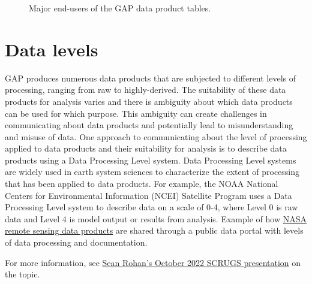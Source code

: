 \documentclass[
  letterpaper,
  oneside,
  open=any]{scrbook}
\begin{document}
\begin{figure}


\caption{\label{fig-data-used}Major end-users of the GAP data product
tables.}

\end{figure}%

\section{Data levels}\label{data-levels}

GAP produces numerous data products that are subjected to different
levels of processing, ranging from raw to highly-derived. The
suitability of these data products for analysis varies and there is
ambiguity about which data products can be used for which purpose. This
ambiguity can create challenges in communicating about data products and
potentially lead to misunderstanding and misuse of data. One approach to
communicating about the level of processing applied to data products and
their suitability for analysis is to describe data products using a Data
Processing Level system. Data Processing Level systems are widely used
in earth system sciences to characterize the extent of processing that
has been applied to data products. For example, the NOAA National
Centers for Environmental Information (NCEI) Satellite Program uses a
Data Processing Level system to describe data on a scale of 0-4, where
Level 0 is raw data and Level 4 is model output or results from
analysis. Example of how
\href{https://ladsweb.modaps.eosdis.nasa.gov/search/}{NASA remote
sensing data products} are shared through a public data portal with
levels of data processing and documentation.

For more information, see
\href{https://docs.google.com/presentation/d/1rWSZpeghWJqzWMIa5oBc4BCoy-zy1Yue86RoTw58u6M/edit?usp=sharing}{Sean
Rohan's October 2022 SCRUGS presentation} on the topic.
\end{document}
